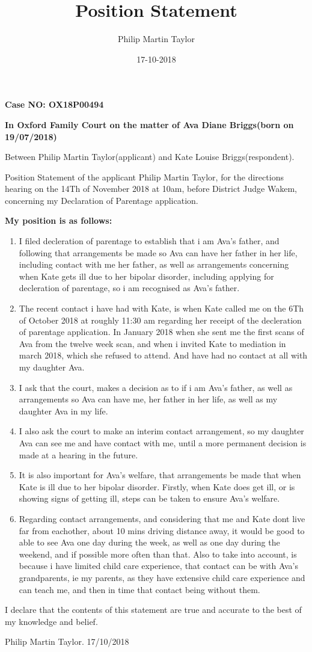 \documentclass[10pt,a4paper]{book}
\date{17-10-2018}
\author{Philip Martin Taylor}
\title{Position Statement}
\begin{document}
 
\begin{flushright} 
  \textbf{Case NO: OX18P00494}
\end{flushright}
\begin{flushright}
  \textbf{In Oxford Family Court on the matter of Ava Diane Briggs(born on 19/07/2018)}
\end{flushright} 
\begin{flushleft}
  Between Philip Martin Taylor(applicant) and Kate Louise Briggs(respondent).
\end{flushleft} 
\begin{flushleft}
  Position Statement of the applicant Philip Martin Taylor, for the directions hearing on the 14Th of November 2018 at 10am, before District Judge Wakem, concerning my Declaration of Parentage application.
\end{flushleft}
\begin{flushleft}
  \textbf{My position is as follows:}
\end{flushleft}
\begin{enumerate}
  \item I filed decleration of parentage to establish that i am Ava's father, and following that arrangements be made so Ava can have her father in her life, including contact with me her father, as well as arrangements concerning when Kate gets ill due to her bipolar disorder, including applying for decleration of parentage, so i am recognised as Ava's father.
  \item The recent contact i have had with Kate, is when Kate called me on the 6Th of October 2018 at roughly 11:30 am regarding her receipt of the decleration of parentage application. In January 2018 when she sent me the first scans of Ava from the twelve week scan, and when i invited Kate to mediation in march 2018, which she refused to attend. And have had no contact at all with my daughter Ava.
  \item I ask that the court, makes a decision as to if i am Ava's father, as well as arrangements so Ava can have me, her father in her life, as well as my daughter Ava in my life.
  \item I also ask the court to make an interim contact arrangement, so my daughter Ava can see me and have contact with me, until a more permanent decision is made at a hearing in the future.
  \item It is also important for Ava's welfare, that arrangements be made that when Kate is ill due to her bipolar disorder. Firstly, when Kate does get ill, or is showing signs of getting ill, steps can be taken to ensure Ava's welfare.
    \item Regarding contact arrangements, and considering that me and Kate dont live far from eachother, about 10 mins driving distance away, it would be good to able to see Ava one day during the week, as well as one day during the weekend, and if possible more often than that. Also to take into account, is because i have limited child care experience, that contact can be with Ava's grandparents, ie my parents, as they have extensive child care experience and can teach me, and then in time that contact being without them. 
    \end{enumerate}
    \begin{flushleft}
      I declare that the contents of this statement are true and accurate to the best of my knowledge and belief.
\end{flushleft}
\begin{center}
  Philip Martin Taylor. 17/10/2018
\end{center}
\end{document}
